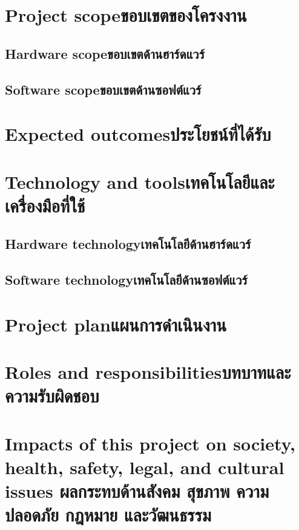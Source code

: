\section{\ifenglish Project scope\else ขอบเขตของโครงงาน\fi}

\subsection{\ifenglish Hardware scope\else ขอบเขตด้านฮาร์ดแวร์\fi}

\subsection{\ifenglish Software scope\else ขอบเขตด้านซอฟต์แวร์\fi}

\section{\ifenglish Expected outcomes\else ประโยชน์ที่ได้รับ\fi}

\section{\ifenglish Technology and tools\else เทคโนโลยีและเครื่องมือที่ใช้\fi}

\subsection{\ifenglish Hardware technology\else เทคโนโลยีด้านฮาร์ดแวร์\fi}

\subsection{\ifenglish Software technology\else เทคโนโลยีด้านซอฟต์แวร์\fi}

\section{\ifenglish Project plan\else แผนการดำเนินงาน\fi}


\section{\ifenglish Roles and responsibilities\else บทบาทและความรับผิดชอบ\fi}

\section{\ifenglish%
Impacts of this project on society, health, safety, legal, and cultural issues
\else%
ผลกระทบด้านสังคม สุขภาพ ความปลอดภัย กฎหมาย และวัฒนธรรม
\fi}

